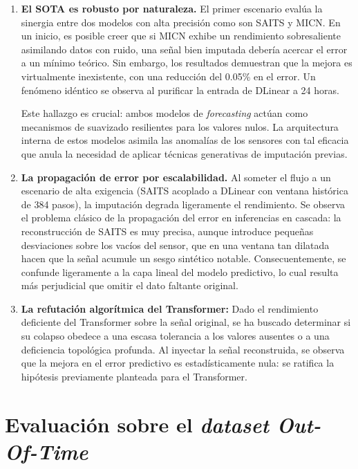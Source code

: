 \begin{enumerate}
	\item \textbf{El SOTA es robusto por naturaleza.}
	El primer escenario evalúa la sinergia entre dos modelos con alta precisión como son SAITS y MICN. En un inicio, es posible creer que si MICN exhibe un rendimiento sobresaliente asimilando datos con ruido, una señal bien imputada debería acercar el error a un mínimo teórico. Sin embargo, los resultados demuestran que la mejora es virtualmente inexistente, con una reducción del 0.05\% en el error. Un fenómeno idéntico se observa al purificar la entrada de DLinear a 24 horas.
	
	Este hallazgo es crucial: ambos modelos de \textit{forecasting} actúan como mecanismos de suavizado resilientes para los valores nulos. La arquitectura interna de estos modelos asimila las anomalías de los sensores con tal eficacia que anula la necesidad de aplicar técnicas generativas de imputación previas.
	
	\item \textbf{La propagación de error por escalabilidad.}
	Al someter el flujo a un escenario de alta exigencia (SAITS acoplado a DLinear con ventana histórica de 384 pasos), la imputación degrada ligeramente el rendimiento. Se observa el problema clásico de la propagación del error en inferencias en cascada: la reconstrucción de SAITS es muy precisa, aunque introduce pequeñas desviaciones sobre los vacíos del sensor, que en una ventana tan dilatada hacen que la señal acumule un sesgo sintético notable. Consecuentemente, se confunde ligeramente a la capa lineal del modelo predictivo, lo cual resulta más perjudicial que omitir el dato faltante original.
	
	\item \textbf{La refutación algorítmica del Transformer:}
	Dado el rendimiento deficiente del Transformer sobre la señal original, se ha buscado determinar si su colapso obedece a una escasa tolerancia a los valores ausentes o a una deficiencia topológica profunda. Al inyectar la señal reconstruida, se observa que la mejora en el error predictivo es estadísticamente nula: se ratifica la hipótesis previamente planteada para el Transformer.
\end{enumerate}




\section{Evaluación sobre el \textit{dataset Out-Of-Time}}
\label{sec:results_oot}

